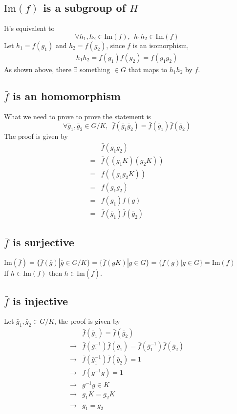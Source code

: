 \documentclass{article}
\renewcommand{\Im}{\text{Im}}
\begin{document}
	\subsection*{$\Im(f)$ is a subgroup of $H$}
	It's equivalent to $$
		\forall h_1,h_2\in\Im(f),\ \ h_1h_2\in\Im(f)
	$$
	Let $h_1 = f(g_1)$ and $h_2 = f(g_2)$, since $f$ is an isomorphism, \begin{align*}
		h_1h_2 = f(g_1)f(g_2) = f(g_1g_2)
	\end{align*}
	As shown above, there $\exists$ something $\in G$ that maps to $h_1h_2$ by $f$.
	\subsection*{$\bar{f}$ is an homomorphism}
	What we need to prove to prove the statement is
	$$
		\forall \bar{g}_1,\bar{g}_2\in G/K,\ \ 
		\bar{f}(\bar{g}_1\bar{g}_2)=\bar{f}(\bar{g}_1)\bar{f}(\bar{g}_2)
	$$
	The proof is given by\begin{align*}
		&\bar{f}(\bar{g}_1\bar{g}_2)\\
		=&\bar{f}((g_1K)(g_2K))\\
		=&\bar{f}((g_1g_2K))\\
		=&f(g_1g_2)\\
		=&f(g_1)f(g)\\
		=&\bar{f}(\bar{g}_1)\bar{f}(\bar{g}_2)
	\end{align*}
	\subsection*{$\bar{f}$ is surjective}
	$\Im(\bar{f})=\{\bar{f}(\bar{g})|\bar{g}\in G/K\}=\{\bar{f}(gK)|g\in G\}=\{f(g)|g\in G\}=\Im(f)$\\
	If $h\in\Im(f)$ then $h\in\Im(\bar{f})$.
	\subsection*{$\bar{f}$ is injective}
	Let $\bar{g}_1,\bar{g}_2\in G/K$, the proof is given by \begin{align*}
		&\bar{f}(\bar{g}_1)=\bar{f}(\bar{g}_2) \\
		\rightarrow &
		\bar{f}(\bar{g}_1^{-1})\bar{f}(\bar{g}_1)=\bar{f}(\bar{g}_1^{-1})\bar{f}(\bar{g}_2) \\
		\rightarrow &
		\bar{f}(\bar{g}_1^{-1})\bar{f}(\bar{g}_2)=1\\
		\rightarrow & f(g^{-1}g)=1\\
		\rightarrow & g^{-1}g\in K\\
		\rightarrow & g_1K=g_2K\\
		\rightarrow & \bar{g}_1=\bar{g}_2
	\end{align*}
\end{document}
